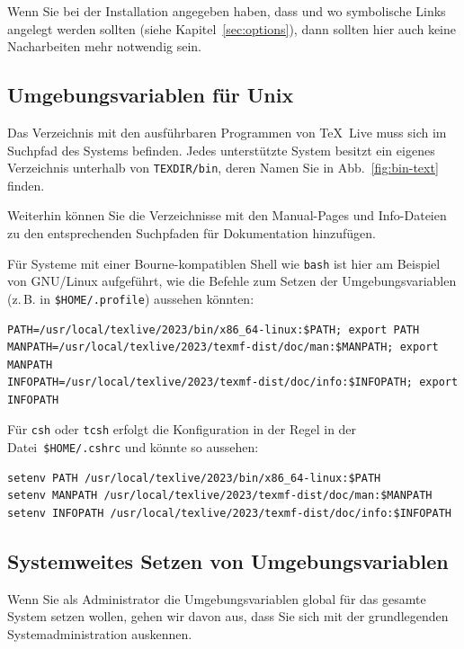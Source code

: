 \documentclass[12pt,ngerman,a4paper,fullparskip]{scrreprt}
\newcommand{\TL}{\TeX\ Live\xspace}
\newcommand{\prog}[1]{\texttt{#1}}
\newcommand{\filename}[1]{\texttt{#1}}
\newcommand{\dirname}[1]{\texttt{#1}}
\begin{document}
Wenn Sie bei der Installation angegeben haben, dass und wo symbolische Links angelegt werden sollten (siehe Kapitel~\ref{sec:options}), dann sollten hier auch keine Nacharbeiten mehr notwendig sein.

\subsection{Umgebungsvariablen für Unix}
\label{sec:env}

Das Verzeichnis mit den ausführbaren Programmen von \TL muss sich im Suchpfad des Systems befinden.
Jedes unterstützte System besitzt ein eigenes Verzeichnis unterhalb von \dirname{TEXDIR/bin}, deren
Namen Sie in Abb.~\ref{fig:bin-text} finden.

Weiterhin können Sie die Verzeichnisse mit den Manual-Pages und Info-Dateien zu den entsprechenden
Suchpfaden für Dokumentation hinzufügen.

Für Systeme mit einer Bourne-kompatiblen Shell wie \prog{bash} ist hier am Beispiel von GNU/Linux
aufgeführt, wie die Befehle zum Setzen der Umgebungsvariablen (z.\,B. in \filename{\$HOME/.profile})
aussehen könnten:

\begin{verbatim}
PATH=/usr/local/texlive/2023/bin/x86_64-linux:$PATH; export PATH
MANPATH=/usr/local/texlive/2023/texmf-dist/doc/man:$MANPATH; export MANPATH
INFOPATH=/usr/local/texlive/2023/texmf-dist/doc/info:$INFOPATH; export INFOPATH
\end{verbatim}


\noindent Für \prog{csh} oder \prog{tcsh} erfolgt die Konfiguration in der Regel in der Datei~\filename{\$HOME/.cshrc}
und könnte so aussehen:

\begin{verbatim}
setenv PATH /usr/local/texlive/2023/bin/x86_64-linux:$PATH
setenv MANPATH /usr/local/texlive/2023/texmf-dist/doc/man:$MANPATH
setenv INFOPATH /usr/local/texlive/2023/texmf-dist/doc/info:$INFOPATH
\end{verbatim}

\subsection{Systemweites Setzen von Umgebungsvariablen}
\label{sec:envglobal}


Wenn Sie als Administrator die Umgebungsvariablen global für das gesamte System setzen wollen,
gehen wir davon aus, dass Sie sich mit der grundlegenden Systemadministration auskennen.
\end{document}
